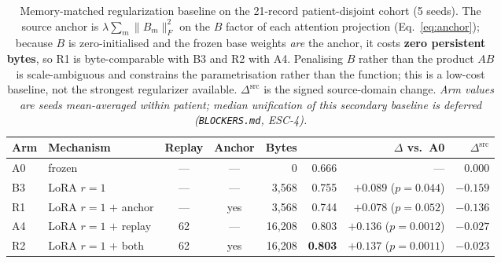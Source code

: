 \begin{table}[H]
\centering
\small
\caption{Memory-matched regularization baseline on the 21-record patient-disjoint
cohort (5 seeds). The source anchor is $\lambda\sum_m\|B_m\|_F^2$ on the $B$
factor of each attention projection (Eq.~\ref{eq:anchor}); because $B$ is
zero-initialised and the frozen base weights \emph{are} the anchor, it costs
\textbf{zero persistent bytes}, so R1 is byte-comparable with B3 and R2 with A4.
Penalising $B$ rather than the product $AB$ is scale-ambiguous and constrains the
parametrisation rather than the function; this is a low-cost baseline, not the
strongest regularizer available. $\Delta^{\mathrm{src}}$ is the signed
source-domain \macrof{} change. \emph{Arm \macrof{} values are seeds mean-averaged
within patient; median unification of this secondary baseline is deferred
(\texttt{BLOCKERS.md}, ESC-4).}}
\label{tab:regularization}
\setlength{\tabcolsep}{4pt}
\begin{tabular}{llccrrrr}
\toprule
Arm & Mechanism & Replay & Anchor & Bytes & \macrof{} & $\Delta$ vs.\ A0 & $\Delta^{\mathrm{src}}$ \\
\midrule
A0 & frozen                    & ---  & ---  & 0        & 0.666 & ---                        & $0.000$ \\
B3 & LoRA $r{=}1$              & ---  & ---  & 3{,}568  & 0.755 & $+0.089$ ($p=0.044$)       & $-0.159$ \\
R1 & LoRA $r{=}1$ $+$ anchor   & ---  & yes  & 3{,}568  & 0.744 & $+0.078$ ($p=0.052$)       & $-0.136$ \\
A4 & LoRA $r{=}1$ $+$ replay   & 62   & ---  & 16{,}208 & 0.803 & $+0.136$ ($p=0.0012$)      & $\mathbf{-0.027}$ \\
R2 & LoRA $r{=}1$ $+$ both     & 62   & yes  & 16{,}208 & \textbf{0.803} & $\mathbf{+0.137}$ ($p=0.0011$) & $-0.023$ \\
\bottomrule
\end{tabular}
\end{table}
